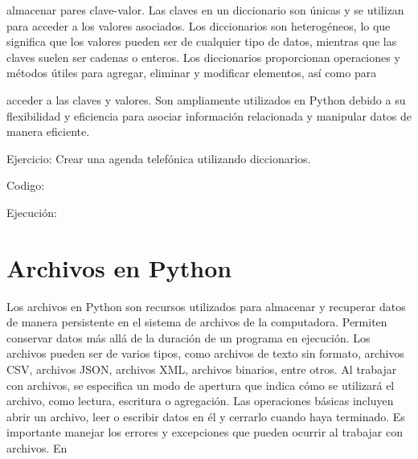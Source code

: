 \documentclass[a4paper]{article}
\begin{document}
{
almacenar pares clave-valor. Las claves en un diccionario son únicas y se utilizan para acceder a los valores asociados.
Los diccionarios son heterogéneos, lo que significa que los valores pueden ser de cualquier tipo de datos, mientras que
las claves suelen ser cadenas o enteros. Los diccionarios proporcionan operaciones y métodos útiles para agregar,
eliminar y modificar elementos, así como para}

{
acceder a las claves y valores. Son ampliamente utilizados en Python debido a su flexibilidad y eficiencia para asociar
información relacionada y manipular datos de manera eficiente.}


\bigskip

{
Ejercicio: Crear una agenda telefónica utilizando diccionarios.}

\clearpage
\pagestyle{Convertediii}



{
Codigo:}

{
Ejecución:}

\clearpage
\pagestyle{Convertediv}




\bigskip

\section{Archivos en Python}

\bigskip

{
Los archivos en Python son recursos utilizados para almacenar y recuperar datos de manera persistente en el sistema de
archivos de la computadora. Permiten conservar datos más allá de la duración de un programa en ejecución. Los archivos
pueden ser de varios tipos, como archivos de texto sin formato, archivos CSV, archivos JSON, archivos XML, archivos
binarios, entre otros. Al trabajar con archivos, se especifica un modo de apertura que indica cómo se utilizará el
archivo, como lectura, escritura o agregación. Las operaciones básicas incluyen abrir un archivo, leer o escribir datos
en él y cerrarlo cuando haya terminado. Es importante manejar los errores y excepciones que pueden ocurrir al trabajar
con archivos. En}
\end{document}

